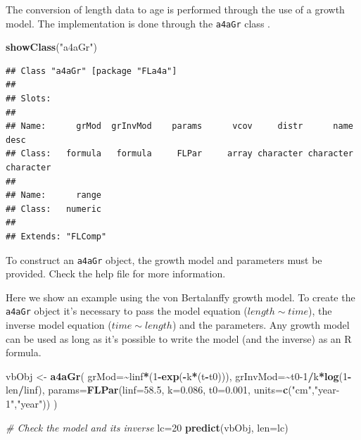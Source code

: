 \documentclass[
]{book}
\newenvironment{Shaded}{\begin{snugshade}}{\end{snugshade}}
\newcommand{\AttributeTok}[1]{\textcolor[rgb]{0.13,0.29,0.53}{#1}}
\newcommand{\CommentTok}[1]{\textcolor[rgb]{0.56,0.35,0.01}{\textit{#1}}}
\newcommand{\DecValTok}[1]{\textcolor[rgb]{0.00,0.00,0.81}{#1}}
\newcommand{\FloatTok}[1]{\textcolor[rgb]{0.00,0.00,0.81}{#1}}
\newcommand{\FunctionTok}[1]{\textcolor[rgb]{0.13,0.29,0.53}{\textbf{#1}}}
\newcommand{\NormalTok}[1]{#1}
\newcommand{\OtherTok}[1]{\textcolor[rgb]{0.56,0.35,0.01}{#1}}
\newcommand{\SpecialCharTok}[1]{\textcolor[rgb]{0.81,0.36,0.00}{\textbf{#1}}}
\newcommand{\StringTok}[1]{\textcolor[rgb]{0.31,0.60,0.02}{#1}}
\begin{document}
The conversion of length data to age is performed through the use of a growth model. The implementation is done through the \texttt{a4aGr} class .

\begin{Shaded}
\begin{Highlighting}[]
\FunctionTok{showClass}\NormalTok{(}\StringTok{"a4aGr"}\NormalTok{)}
\end{Highlighting}
\end{Shaded}

\begin{verbatim}
## Class "a4aGr" [package "FLa4a"]
## 
## Slots:
##                                                                             
## Name:      grMod  grInvMod    params      vcov     distr      name      desc
## Class:   formula   formula     FLPar     array character character character
##                 
## Name:      range
## Class:   numeric
## 
## Extends: "FLComp"
\end{verbatim}

To construct an \texttt{a4aGr} object, the growth model and parameters must be provided. Check the help file for more information.

Here we show an example using the von Bertalanffy growth model. To create the \texttt{a4aGr} object it's necessary to pass the model equation (\(length \sim time\)), the inverse model equation (\(time \sim length\)) and the parameters. Any growth model can be used as long as it's possible to write the model (and the inverse) as an R formula.

\begin{Shaded}
\begin{Highlighting}[]
\NormalTok{vbObj }\OtherTok{\textless{}{-}} \FunctionTok{a4aGr}\NormalTok{(}
    \AttributeTok{grMod=}\SpecialCharTok{\textasciitilde{}}\NormalTok{linf}\SpecialCharTok{*}\NormalTok{(}\DecValTok{1}\SpecialCharTok{{-}}\FunctionTok{exp}\NormalTok{(}\SpecialCharTok{{-}}\NormalTok{k}\SpecialCharTok{*}\NormalTok{(t}\SpecialCharTok{{-}}\NormalTok{t0))),      }
    \AttributeTok{grInvMod=}\SpecialCharTok{\textasciitilde{}}\NormalTok{t0}\DecValTok{{-}1}\SpecialCharTok{/}\NormalTok{k}\SpecialCharTok{*}\FunctionTok{log}\NormalTok{(}\DecValTok{1}\SpecialCharTok{{-}}\NormalTok{len}\SpecialCharTok{/}\NormalTok{linf),      }
    \AttributeTok{params=}\FunctionTok{FLPar}\NormalTok{(}\AttributeTok{linf=}\FloatTok{58.5}\NormalTok{, }\AttributeTok{k=}\FloatTok{0.086}\NormalTok{, }\AttributeTok{t0=}\FloatTok{0.001}\NormalTok{, }\AttributeTok{units=}\FunctionTok{c}\NormalTok{(}\StringTok{"cm"}\NormalTok{,}\StringTok{"year{-}1"}\NormalTok{,}\StringTok{"year"}\NormalTok{))     }
\NormalTok{)}

\CommentTok{\# Check the model and its inverse}
\NormalTok{lc}\OtherTok{=}\DecValTok{20}
\FunctionTok{predict}\NormalTok{(vbObj, }\AttributeTok{len=}\NormalTok{lc)}
\end{Highlighting}
\end{Shaded}
\end{document}

